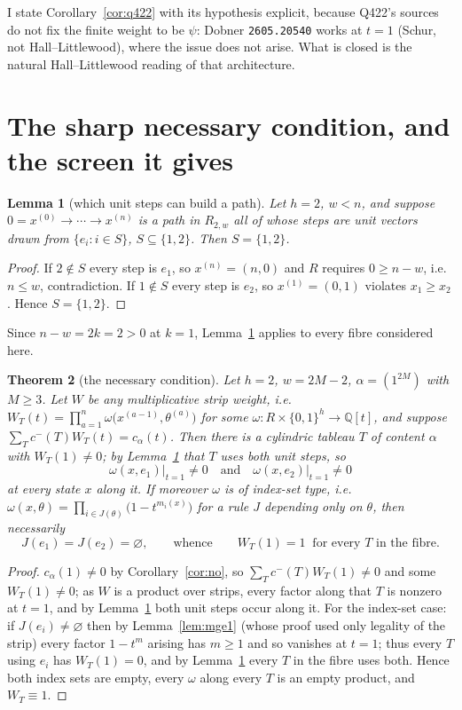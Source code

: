 \documentclass[11pt]{article}
\theoremstyle{plain}
\newtheorem{theorem}{Theorem}
\newtheorem{lemma}[theorem]{Lemma}
\theoremstyle{definition}
\begin{document}
I state Corollary~\ref{cor:q422} with its hypothesis explicit, because Q422's sources do not fix
the finite weight to be $\psi$: Dobner \texttt{2605.20540} works at $t=1$ (Schur, not
Hall--Littlewood), where the issue does not arise. What is closed is the natural
Hall--Littlewood reading of that architecture.

\section{The sharp necessary condition, and the screen it gives}

\begin{lemma}[which unit steps can build a path]\label{lem:unit}
Let $h=2$, $w<n$, and suppose $0=x^{(0)}\to\cdots\to x^{(n)}$ is a path in $R_{2,w}$ all of whose
steps are unit vectors drawn from $\{e_i:i\in S\}$, $S\subseteq\{1,2\}$. Then $S=\{1,2\}$.
\end{lemma}

\begin{proof}
If $2\notin S$ every step is $e_1$, so $x^{(n)}=(n,0)$ and $R$ requires $0\ge n-w$, i.e.\
$n\le w$, contradiction. If $1\notin S$ every step is $e_2$, so $x^{(1)}=(0,1)$ violates
$x_1\ge x_2$. Hence $S=\{1,2\}$.
\end{proof}

Since $n-w=2k=2>0$ at $k=1$, Lemma~\ref{lem:unit} applies to every fibre considered here.

\begin{theorem}[the necessary condition]\label{thm:nec}
Let $h=2$, $w=2M-2$, $\alpha=(1^{2M})$ with $M\ge3$. Let $W$ be any \emph{multiplicative strip
weight}, i.e.\ $W_T(t)=\prod_{a=1}^{n}\omega\bigl(x^{(a-1)},\theta^{(a)}\bigr)$ for some
$\omega:R\times\{0,1\}^h\to\mathbb{Q}[t]$, and suppose $\sum_T c^-(T)W_T(t)=c_\alpha(t)$. Then
there is a cylindric tableau $T$ of content $\alpha$ with $W_T(1)\ne0$; by
Lemma~\ref{lem:unit} that $T$ uses both unit steps, so
\[
\omega(x,e_1)\big|_{t=1}\ne0\quad\text{and}\quad\omega(x,e_2)\big|_{t=1}\ne0
\]
at every state $x$ along it. If moreover $\omega$ is of \emph{index-set type}, i.e.\
$\omega(x,\theta)=\prod_{i\in J(\theta)}\bigl(1-t^{m_i(x)}\bigr)$ for a rule $J$ depending only
on $\theta$, then necessarily
\[
J(e_1)=J(e_2)=\varnothing,
\qquad\text{whence}\qquad W_T(1)=1\ \text{ for every }T\text{ in the fibre.}
\]
\end{theorem}

\begin{proof}
$c_\alpha(1)\ne0$ by Corollary~\ref{cor:no}, so $\sum_Tc^-(T)W_T(1)\ne0$ and some $W_T(1)\ne0$;
as $W$ is a product over strips, every factor along that $T$ is nonzero at $t=1$, and by
Lemma~\ref{lem:unit} both unit steps occur along it. For the index-set case: if
$J(e_i)\ne\varnothing$ then by Lemma~\ref{lem:mge1} (whose proof used only legality of the
strip) every factor $1-t^{m}$ arising has $m\ge1$ and so vanishes at $t=1$; thus every $T$ using
$e_i$ has $W_T(1)=0$, and by Lemma~\ref{lem:unit} every $T$ in the fibre uses both. Hence both
index sets are empty, every $\omega$ along every $T$ is an empty product, and $W_T\equiv1$.
\end{proof}
\end{document}
